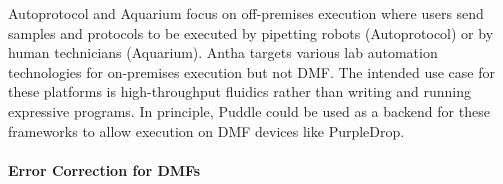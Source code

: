 \documentclass[sigplan, screen]{acmart}
\begin{document}
Autoprotocol \cite{autoprotocol} and Aquarium \cite{aquarium} focus on off-premises execution where users send samples and protocols to be executed by pipetting robots (Autoprotocol) or by human technicians (Aquarium).
Antha \cite{antha} targets various lab automation technologies for on-premises execution but not DMF.
The intended use case for these platforms is high-throughput fluidics rather than writing and running expressive programs.
In principle, Puddle could be used as a backend for these frameworks to allow execution on DMF devices like PurpleDrop.




\paragraph{Error Correction for DMFs}
\end{document}
